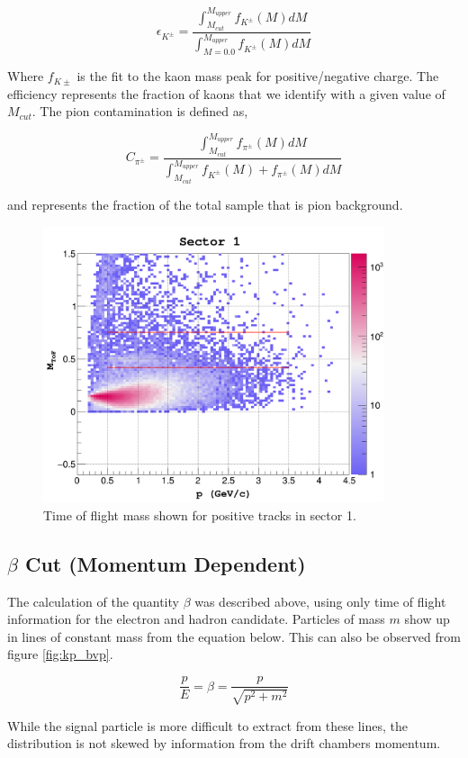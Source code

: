\begin{equation}
  \mathcal{\epsilon}_{K^{\pm}} = \frac{\int_{M_{cut}}^{M_{upper}} f_{K^\pm}(M) dM }{\int_{M = 0.0}^{M_{upper}} f_{K^\pm}(M) dM }
\end{equation}

Where $f_{K\pm}$ is the fit to the kaon mass peak for positive/negative charge.  The efficiency represents the fraction of kaons that we identify with a given value of $M_{cut}$. The pion contamination is defined as,

\begin{equation}
  C_{\pi^{\pm}} = \frac{\int_{M_{cut}}^{M_{upper}} f_{\pi^\pm}(M) dM }{\int_{M_{cut}}^{M_{upper}} f_{K^\pm}(M) +  f_{\pi^\pm}(M) dM }
\end{equation}

and represents the fraction of the total sample that is pion background.


\begin{figure}
  \begin{centering}
    \includegraphics[width=10cm]{image/km/TofMassSector1.png}
    \caption{Time of flight mass shown for positive tracks in sector 1.}
  \end{centering}
\end{figure}


\subsection{$\beta$ Cut (Momentum Dependent)}

The calculation of the quantity $\beta$ was described above, using only time of flight information for the electron and hadron candidate.  Particles of mass $m$ show up in lines of constant mass from the equation below.  This can also be observed from figure \ref{fig:kp_bvp}. 

\begin{equation}
  \frac{p}{E} = \beta = \frac{p}{\sqrt{p^{2} + m^{2}}} 
\end{equation}

While the signal particle is more difficult to extract from these lines, the distribution is not skewed by information from the drift chambers momentum.    






